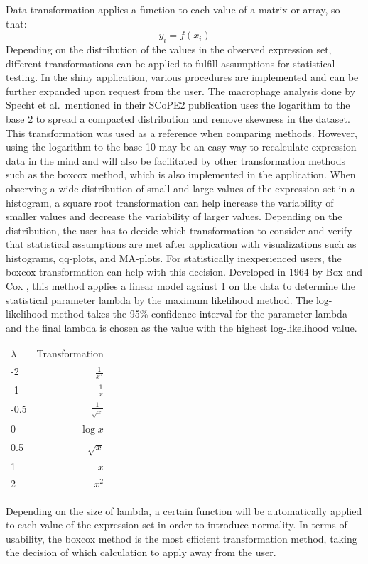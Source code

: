 \documentclass[
  11pt,
]{article}
\begin{document}
Data transformation applies a function to each value of a matrix or
array, so that: \[
y_i = f(x_i)
\] Depending on the distribution of the values in the observed
expression set, different transformations can be applied to fulfill
assumptions for statistical testing. In the shiny application, various
procedures are implemented and can be further expanded upon request from
the user. The macrophage analysis done by Specht et al.~mentioned in
their SCoPE2 publication \citep{Specht2021} uses the logarithm to the
base 2 to spread a compacted distribution and remove skewness in the
dataset. This transformation was used as a reference when comparing
methods. However, using the logarithm to the base 10 may be an easy way
to recalculate expression data in the mind and will also be facilitated
by other transformation methods such as the boxcox method, which is also
implemented in the application. When observing a wide distribution of
small and large values of the expression set in a histogram, a square
root transformation can help increase the variability of smaller values
and decrease the variability of larger values. Depending on the
distribution, the user has to decide which transformation to consider
and verify that statistical assumptions are met after application with
visualizations such as histograms, qq-plots, and MA-plots. For
statistically inexperienced users, the boxcox transformation can help
with this decision. Developed in 1964 by Box and Cox \citep{Sakia1992},
this method applies a linear model against 1 on the data to determine
the statistical parameter lambda by the maximum likelihood method. The
log-likelihood method takes the 95\% confidence interval for the
parameter lambda and the final lambda is chosen as the value with the
highest log-likelihood value.

\begin{center}
\begin{tabular}{l r}
$\lambda$ & Transformation \\
-2 & $\frac{1}{x^2}$ \\
-1 & $\frac{1}{x}$ \\
-0.5 & $\frac{1}{\sqrt{x}}$ \\
0 & $\log{x}$ \\
0.5 & $\sqrt{x}$ \\
1 & $x$ \\
2 & $x^2$
\end{tabular}
\end{center}

Depending on the size of lambda, a certain function will be
automatically applied to each value of the expression set in order to
introduce normality. In terms of usability, the boxcox method is the
most efficient transformation method, taking the decision of which
calculation to apply away from the user.
\end{document}
